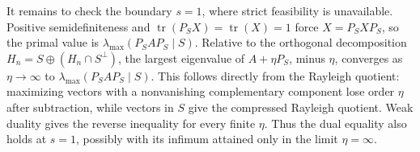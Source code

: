 It remains to check the boundary \(s=1\), where strict feasibility is unavailable.  Positive semidefiniteness and
\(\operatorname{tr}(P_SX)=\operatorname{tr}(X)=1\) force \(X=P_SXP_S\), so the primal value is
\(\lambda_{\max}(P_SAP_S\mid S)\).  Relative to the orthogonal decomposition \(H_n=S\oplus(H_n\cap S^\perp)\), the largest eigenvalue of \(A+\eta P_S\), minus \(\eta\), converges as \(\eta\to\infty\) to \(\lambda_{\max}(P_SAP_S\mid S)\).  This follows directly from the Rayleigh quotient: maximizing vectors with a nonvanishing complementary component lose order \(\eta\) after subtraction, while vectors in \(S\) give the compressed Rayleigh quotient.  Weak duality gives the reverse inequality for every finite \(\eta\).  Thus the dual equality also holds at \(s=1\), possibly with its infimum attained only in the limit \(\eta=\infty\).